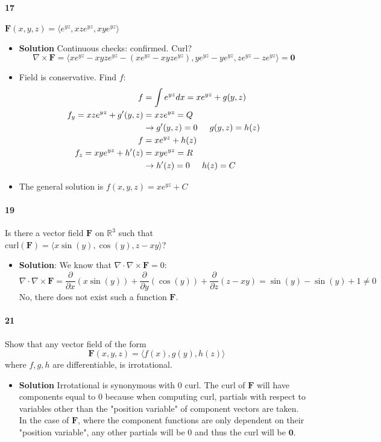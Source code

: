 \documentclass{article}
\newcommand{\parf}[2]{\frac{\partial #1}{\partial #2}}
\begin{document}
    \paragraph{17} $\mathbf{F}(x,y,z) = \langle e^{yz}, xze^{yz}, xye^{yz}\rangle$
    \begin{itemize}
        \item \textbf{Solution} Continuous checks: confirmed. Curl?
        \[ \nabla \times \mathbf{F} = \langle xe^{yz}-xyze^{yz}-(xe^{yz}-xyze^{yz}), ye^{yz}-ye^{yz}, ze^{yz}-ze^{yz} \rangle = \mathbf{0}\]
        \item Field is conservative. Find $f$:
        \begin{align*}
            f &= \int e^{yz}dx = xe^{yz} + g(y,z)\\
            f_y = xze^{yz} + g'(y,z) &= xze^{yz} = Q\\
            &\rightarrow g'(y,z) = 0 \hspace{0.2in} g(y,z) = h(z)\\
            f &= xe^{yz} + h(z) \\
            f_z = xye^{yz} + h'(z) &= xye^{yz} = R\\
            &\rightarrow h'(z) = 0 \hspace{0.2in} h(z) = C\\
        \end{align*}
        \item The general solution is $f(x,y,z) = xe^{yz} + C$
    \end{itemize}

    \paragraph{19} Is there a vector field $\mathbf{F}$ on $\mathbb{R}^3$ such that $\mathrm{curl}(\mathbf{F})=\langle x\sin(y), \cos(y), z-xy \rangle$?
    \begin{itemize}
        \item \textbf{Solution}: We know that $\nabla \cdot \nabla \times \mathbf{F} = 0$:
        \[ \nabla \cdot \nabla \times \mathbf{F} = \parf{}{x}(x\sin(y)) + \parf{}{y}(\cos(y)) + \parf{}{z}(z-xy) =\sin(y) - \sin(y) + 1 \neq 0 \]
        No, there does not exist such a function $\mathbf{F}$.
    \end{itemize}

    \paragraph{21} Show that any vector field of the form
    \[
        \mathbf{F}(x,y,z) = \langle f(x), g(y), h(z) \rangle
    \]
    where $f,g,h$ are differentiable, is irrotational.
    \begin{itemize}
        \item \textbf{Solution} Irrotational is synonymous with 0 curl. The curl of $\mathbf{F}$ will have components equal to 0
        because when computing curl, partials with respect to variables other than the "position variable" of component vectors are taken.
        In the case of $\mathbf{F}$, where the component functions are only dependent on their "position variable", any other partials will be 0 and thus
        the curl will be $\mathbf{0}$.
    \end{itemize}
\end{document}
